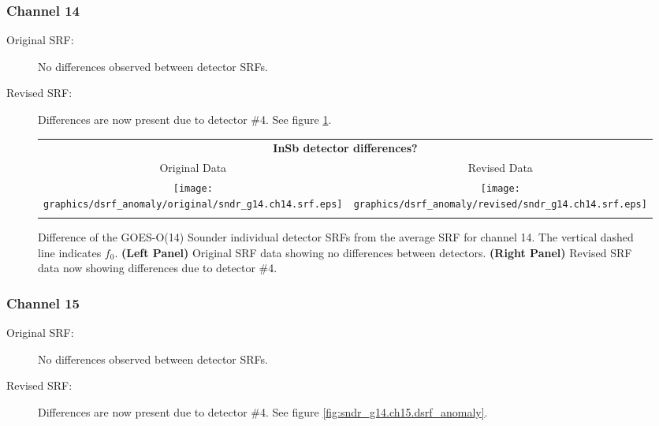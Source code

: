 \subsubsection{Channel 14}
\begin{description}
  \item[Original SRF:] No differences observed between detector SRFs.
  \item[Revised SRF:]  Differences are now present due to detector \#4. See figure \ref{fig:sndr_g14.ch14.dsrf_anomaly}.
\end{description}

\begin{figure}[htp]
  \centering
  \begin{tabular}{c c}
    \multicolumn{2}{c}{\textsf{\bfseries InSb detector differences?}} \\
    \hspace{1.5em}\textsf{Original Data} &
    \hspace{1.5em}\textsf{Revised Data} \\
    \texttt{[image: graphics/dsrf\_anomaly/original/sndr\_g14.ch14.srf.eps]} &
    \texttt{[image: graphics/dsrf\_anomaly/revised/sndr\_g14.ch14.srf.eps]} \\\\
  \end{tabular}
  \caption{Difference of the GOES-O(14) Sounder individual detector SRFs from the average SRF for channel 14. The vertical dashed line indicates $f_0$. \textbf{(Left Panel)} Original SRF data showing no differences between detectors. \textbf{(Right Panel)} Revised SRF data now showing differences due to detector \#4.}
  \label{fig:sndr_g14.ch14.dsrf_anomaly}
\end{figure}

\subsubsection{Channel 15}
\begin{description}
  \item[Original SRF:] No differences observed between detector SRFs.
  \item[Revised SRF:]  Differences are now present due to detector \#4. See figure \ref{fig:sndr_g14.ch15.dsrf_anomaly}.
\end{description}

